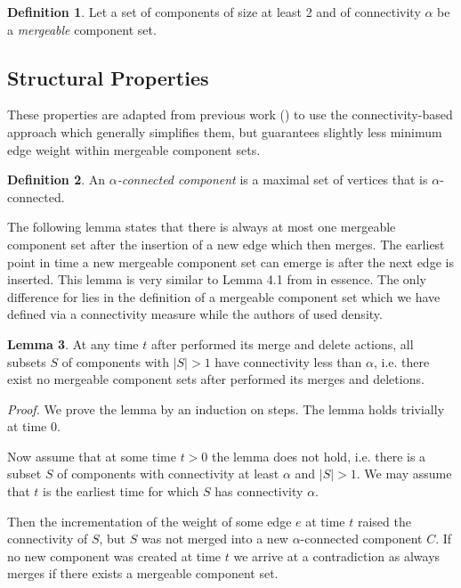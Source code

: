 \documentclass[a4paper, 10pt]{article}
\newcommand{\crep}{\text{C{\scriptsize REP}}}
\theoremstyle{definition}
\newtheorem{defi}{Definition}
\newtheorem{lemma}[defi]{Lemma}
\begin{document}
\begin{defi}
	Let a set of components of size at least 2 and of connectivity $\alpha$ be a \textit{mergeable} component set.	
\end{defi}


\subsection{Structural Properties}


These properties are adapted from previous work (\cite{Avin2015, Avin2016}) to use the connectivity-based approach which generally simplifies them, but guarantees slightly less minimum edge weight within mergeable component sets.
\begin{defi}
	An $\alpha$\textit{-connected component} is a maximal set of vertices that is $\alpha$-connected.
\end{defi}

The following lemma states that there is always at most one mergeable component set after the insertion of a new edge which \crep{} then merges. The earliest point in time a new mergeable component set can emerge is after the next edge is inserted. This lemma is very similar to Lemma 4.1 from \cite{Avin2015} in essence. The only difference for \crep{} lies in the definition of a mergeable component set which we have defined via a connectivity measure while the authors of \cite{Avin2015} used density.

\begin{lemma}
	\label{mergeableLemma}
	At any time $t$ after \crep{} performed its merge and delete actions, all subsets $S$ of components with $|S|>1$ have connectivity less than $\alpha$, i.e. there exist no mergeable component sets after \crep{} performed its merges and deletions.
\end{lemma}

\textit{Proof.} We prove the lemma by an induction on steps. The lemma holds trivially at time 0.

Now assume that at some time $t>0$ the lemma does not hold, i.e. there is a subset $S$ of components with connectivity at least $\alpha$ and $|S|>1$. We may assume that $t$ is the earliest time for which $S$ has connectivity $\alpha$.

Then the incrementation of the weight of some edge $e$ at time $t$ raised the connectivity of $S$, but $S$ was not merged into a new $\alpha$-connected component $C$. If no new component was created at time $t$ we arrive at a contradiction as \crep{} always merges if there exists a mergeable component set.
\end{document}
